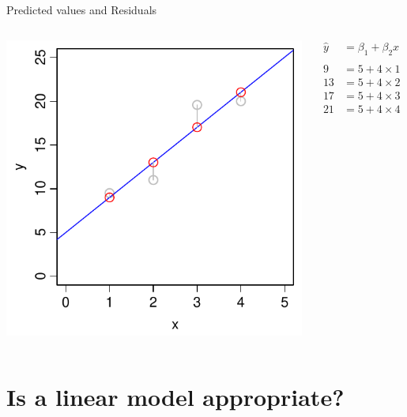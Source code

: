 \documentclass[xcolor=x11names,compress]{beamer}
\renewcommand{\(}{\begin{columns}}
\renewcommand{\)}{\end{columns}}
\newcommand{\<}[1]{\begin{column}{#1}}
\renewcommand{\>}{\end{column}}
\begin{document}
\begin{frame}{Predicted values and Residuals}

\begin{columns}[T]

		\includegraphics[width=\textwidth]{Predicted.pdf}
		
		\begin{align*}
		  \hat{y}  &= \beta_1 + \beta_2 x  \\
		  \\
		  9  &= 5 + 4 \times 1 \\
		  13 &= 5 + 4 \times 2 \\
		  17 &= 5 + 4 \times 3 \\
		  21 &= 5 + 4 \times 4  
		\end{align*}
\end{columns}		
\end{frame}



\section{Is a linear model appropriate?}
\end{document}
